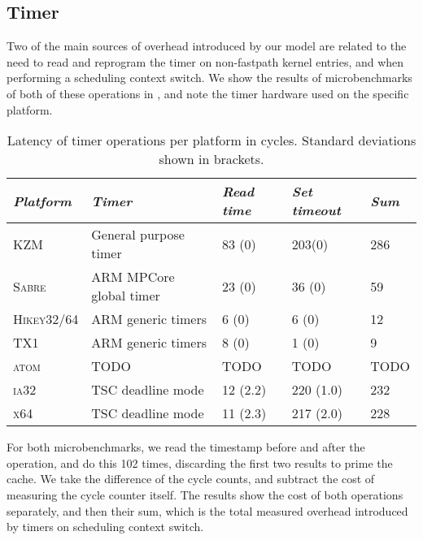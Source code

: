\subsection{Timer}

Two of the main sources of overhead introduced by our model are related to the need to read and reprogram the timer on
non-fastpath kernel entries, and when performing a scheduling context switch. We show the results of
microbenchmarks of both of these operations in , and note the timer
hardware used on the specific platform. 

\begin{table}[ht]\centering
{}
\begin{tabular}{*5l}\toprule
    \emph{Platform} & \emph{Timer} & \emph{Read time} & \emph{Set timeout} & \emph{Sum}
    \\\midrule
    \textsc{KZM}               & General purpose timer    & 83 (0)   & 203(0)  & 286   \\
    \textsc{Sabre}             & ARM MPCore global timer  & 23 (0)   & 36 (0)  & 59    \\
    \textsc{Hikey32/64}        & ARM generic timers       &  6 (0)   &  6 (0)  & 12    \\
    \textsc{TX1}               & ARM generic timers       &  8 (0)   &  1 (0)  & 9     \\
    \textsc{atom}              & TODO                     & TODO     & TODO    & TODO  \\
    \textsc{ia32}              & TSC deadline mode        & 12 (2.2) & 220 (1.0) & 232 \\
    \textsc{x64}               & TSC deadline mode        & 11 (2.3) & 217 (2.0) & 228 \\
    \bottomrule\hline
\end{tabular}
\caption{Latency of timer operations per platform in cycles. Standard deviations shown
in brackets.}
\label{t:evaluation-timer}
\end{table}

For both microbenchmarks, we read the timestamp before and after the operation, and do this 102
times, discarding the first two results to prime the cache.  We take the difference of the cycle
counts, and subtract the cost of measuring the cycle counter itself. The results show the cost of
both operations separately, and then their sum, which is the total measured overhead introduced by timers on
scheduling context switch.

